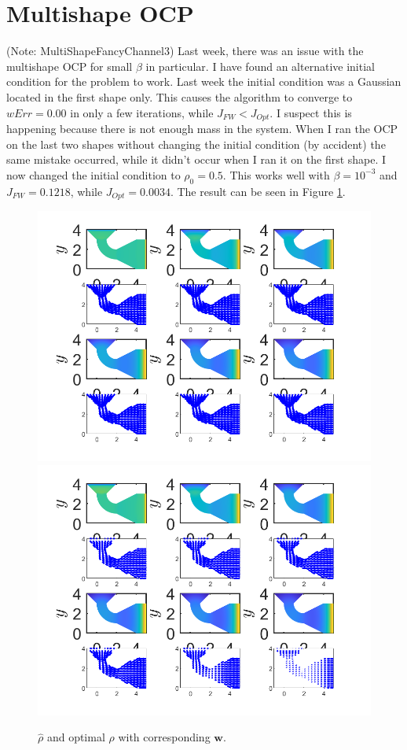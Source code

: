 \documentclass[11pt, a4paper]{article}
\theoremstyle{definition}
\newcommand{\w}{\mathbf{w}}
\newcommand{\hr}{\widehat \rho}
\begin{document}
	
	\section{Multishape OCP}
	(Note: MultiShapeFancyChannel3)
	Last week, there was an issue with the multishape OCP for small $\beta$ in particular. I have found an alternative initial condition for the problem to work. Last week the initial condition was a Gaussian located in the first shape only. This causes the algorithm to converge to $wErr = 0.00$ in only a few iterations, while $J_{FW} < J_{Opt}$. I suspect this is happening because there is not enough mass in the system. When I ran the OCP on the last two shapes without changing the initial condition (by accident) the same mistake occurred, while it didn't occur when I ran it on the first shape. 
	I now changed the initial condition to $\rho_0 = 0.5$. This works well with $\beta = 10^{-3}$ and $J_{FW} = 0.1218$, while $J_{Opt} = 0.0034$. The result can be seen in Figure \ref{F1}.
	\begin{figure}[h]
		\centering
		\includegraphics[scale=0.35]{F1.png}
		\includegraphics[scale=0.35]{F2.png}
		\caption{$\hr$ and optimal $\rho$ with corresponding $\w$.} 
		\label{F1}
	\end{figure}
\end{document}
